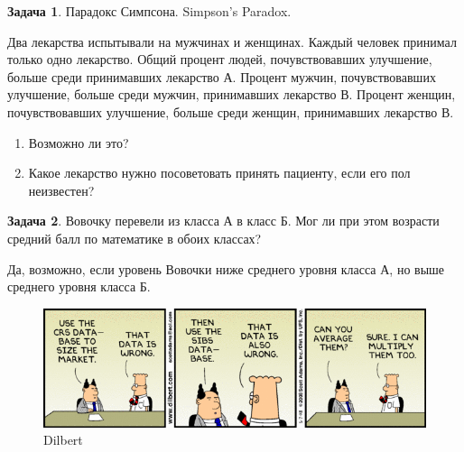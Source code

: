 \documentclass[nobib]{tufte-handout}
\theoremstyle{definition}
\newtheorem{problem}{Задача}
\begin{document}
\begin{problem}
Парадокс Симпсона.  Simpson's Paradox.

Два лекарства испытывали на мужчинах и женщинах. Каждый
человек принимал только одно лекарство. Общий процент людей,
почувствовавших улучшение, больше среди принимавших лекарство А.
Процент мужчин, почувствовавших улучшение, больше среди мужчин, принимавших лекарство В. Процент женщин, почувствовавших улучшение, больше среди женщин, принимавших лекарство В.

\begin{enumerate}
\item Возможно ли это?
\item Какое лекарство нужно посоветовать принять пациенту, если его пол неизвестен?
\end{enumerate}


\end{problem}


\begin{problem}
Вовочку перевели из класса А в класс Б. Мог ли при этом возрасти средний балл по математике в обоих классах?

\begin{sol}
Да, возможно, если уровень Вовочки ниже среднего уровня класса А, но выше среднего уровня класса Б.
\end{sol}

\begin{figure}
  \includegraphics[width=17cm]{images/average.png}
  \caption{Dilbert}
\end{figure}



\end{problem}
\end{document}
